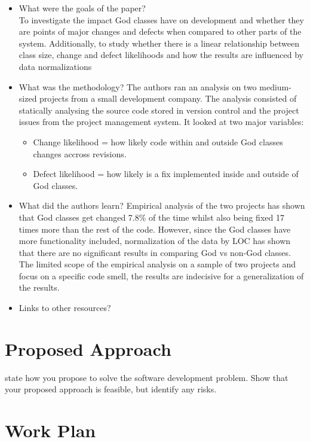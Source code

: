 \documentclass{mprop}
\begin{document}
\begin{itemize}
	\item What were the goals of the paper? \\
	To investigate the impact God classes have on development and whether they are points of major changes and defects when compared to other parts of the system. Additionally, to study whether there is a linear relationship between class size, change and defect likelihoods and how the results are influenced by data normalizations

	\item What was the methodology?
	The authors ran an analysis on two medium-sized projects from a small development company. The analysis consisted of statically analysing the source code stored in version control and the project issues from the project management system.
	It looked at two major variables:
		\begin{itemize}
			\item Change likelihood = how likely code within and outside God classes changes accross revisions.
			\item Defect likelihood = how likely is a fix implemented inside and outside of God classes.
		\end{itemize}
	\item What did the authors learn?
	Empirical analysis of the two projects has shown that God classes get changed 7.8\% of the time whilst also being fixed 17 times more than the rest of the code.
	However, since the God classes have more functionality included, normalization of the data by LOC has shown that there are no significant results in comparing God vs non-God classes.
	The limited scope of the empirical analysis on a sample of two projects and focus on a specific code smell, the results are indecisive for a generalization of the results.
	\item Links to other resources?
\end{itemize}
\section{Proposed Approach}

state how you propose to solve the software development problem. Show that your proposed approach is feasible, but identify any risks.

\section{Work Plan}
\end{document}
